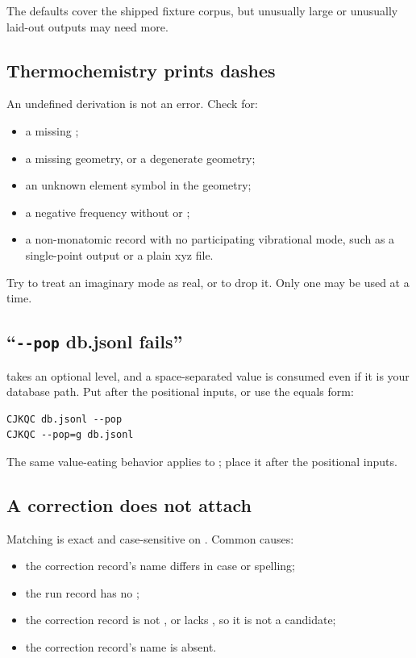 The defaults cover the shipped fixture corpus, but unusually large or
unusually laid-out outputs may need more.

\subsection{Thermochemistry prints dashes}

An undefined derivation is not an error. Check for:

\begin{itemize}
  \item a missing ;
  \item a missing geometry, or a degenerate geometry;
  \item an unknown element symbol in the geometry;
  \item a negative frequency without  or
        ;
  \item a non-monatomic record with no participating vibrational mode, such
        as a single-point output or a plain xyz file.
\end{itemize}

Try  to treat an imaginary mode as real, or
 to drop it. Only one may be used at a time.

\subsection{``\texttt{-{}-pop} db.jsonl fails''}

 takes an optional level, and a space-separated value is consumed
even if it is your database path. Put  after the positional inputs,
or use the equals form:

\begin{verbatim}
CJKQC db.jsonl --pop
CJKQC --pop=g db.jsonl
\end{verbatim}

The same value-eating behavior applies to ; place it after
the positional inputs.

\subsection{A correction does not attach}

Matching is exact and case-sensitive on . Common causes:

\begin{itemize}
  \item the correction record's name differs in case or spelling;
  \item the run record has no ;
  \item the correction record is not , or lacks
        , so it is not a candidate;
  \item the correction record's name is absent.
\end{itemize}

